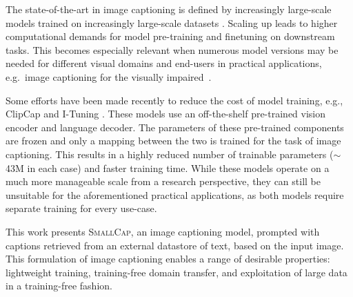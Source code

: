 \documentclass[10pt,twocolumn,letterpaper]{article}
\begin{document}
The state-of-the-art in image captioning
is defined by increasingly large-scale models trained on increasingly large-scale datasets \cite{wang2021simvlm, hu2022scaling, wang2022git, li2022blip}. 
Scaling up 
leads to higher computational demands for model pre-training and finetuning on downstream tasks. This becomes especially relevant when numerous model versions may be needed for different visual domains \cite{Agrawal_2019} and end-users in practical applications, e.g.\ image captioning for the visually impaired~\cite{gurari2020captioning}.

Some efforts have been made recently to reduce the cost of model training, e.g., ClipCap \cite{clipcap} and I-Tuning \cite{luo2022tuning}. %
These models use an off-the-shelf pre-trained vision encoder
and language decoder.
The parameters of these pre-trained components are frozen and only a mapping between the two is trained for the task of image captioning. This results in a highly reduced number of trainable parameters ($\sim$43M in each case) and faster training time.
While these models operate on a much more manageable scale from a research perspective, they can still be unsuitable for the aforementioned practical applications, as both models require separate training for every use-case.



This work presents \textsc{SmallCap}, an image captioning model, prompted with captions retrieved from an external datastore of text, based on the input image. This formulation of image captioning enables a range of desirable properties: lightweight training, training-free domain transfer, and exploitation of large data in a training-free fashion.  
\end{document}
